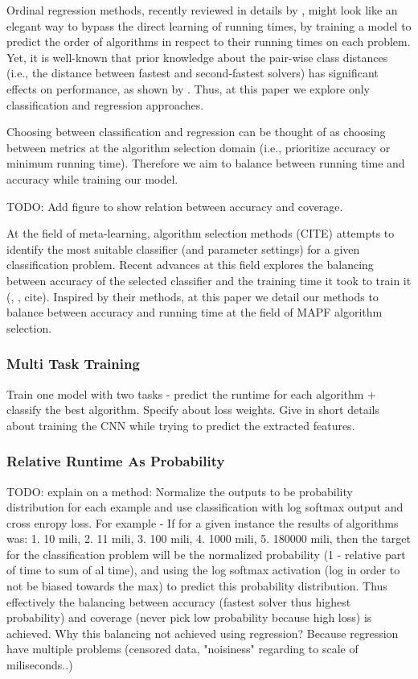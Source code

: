 \documentclass[letterpaper]{article} %
\newcommand\Roni[1]{\nb{\textbf{Roni:}}{red}{#1}}
\begin{document}
Ordinal regression methods, recently reviewed in details by \cite{gutierrez2015ordinal}, might look like an elegant way to bypass the direct learning of running times, by training a model to predict the order of algorithms in respect to their running times on each problem. Yet, it is well-known that prior knowledge about the pair-wise class distances (i.e., the distance between fastest and second-fastest solvers) has significant effects on performance, as shown by \cite{sanchez2013exploitation}. Thus, at this paper we explore only classification and regression approaches.

Choosing between classification and regression can be thought of as choosing between metrics at the algorithm selection domain (i.e., prioritize accuracy or minimum running time). Therefore we aim to balance between running time and accuracy while training our model.

TODO: Add figure to show relation between accuracy and coverage. 


At the field of meta-learning, algorithm selection methods (CITE) attempts to identify the most suitable classifier (and parameter settings) for a given classification problem. Recent advances at this field explores the balancing between accuracy of the selected classifier and the training time it took to train it (\cite{brazdil2003ranking}, \cite{}, cite{}). Inspired by their methods, at this paper we detail our methods to balance between accuracy and running time at the field of MAPF algorithm selection.

\subsubsection{Multi Task Training}
Train one model with two tasks - predict the runtime for each algorithm + classify the best algorithm. Specify about loss weights.
Give in short details about training the CNN while trying to predict the extracted features.

\subsubsection{Relative Runtime As Probability}
TODO: explain on a method: Normalize the outputs to be probability distribution for each example and use classification with log softmax output and cross enropy loss.
For example - If for a given instance the results of algorithms was: 1. 10 mili, 2. 11 mili, 3. 100 mili, 4. 1000 mili, 5. 180000 mili, then the target for the classification problem will be the normalized probability (1 - relative part of time to sum of al time), and using the log softmax activation (log in order to not be biased towards the max) to predict this probability distribution. Thus effectively the balancing between accuracy (fastest solver thus highest probability) and coverage (never pick low probability because high loss) is achieved. 
Why this balancing not achieved using regression? Because regression have multiple problems (censored data, "noisiness" regarding to scale of miliseconds..)
\Roni{Do we have experiments for this?}
\end{document}
